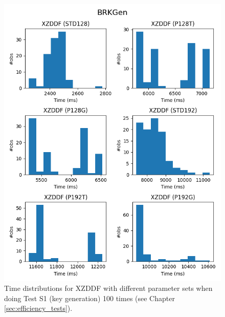 \begin{figure}[ht]
    \centering
    \includegraphics[width=\textwidth]{data/figures/BRKGen_distributions_2.png}
    \caption{Time distributions for XZDDF with different parameter sets when doing Test S1 (key generation) 100 times (see Chapter \ref{sec:efficiency_tests}).}
    \label{fig:distr_brkgen2}
\end{figure}


